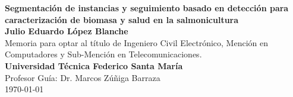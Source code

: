 \pagestyle{fancy}

\begin{center}
    {\singlespacing\Large{\textbf{Segmentación de instancias y seguimiento basado en detección para caracterización de biomasa y salud en la salmonicultura}}}\\

    \normalsize
    \textbf{Julio Eduardo López Blanche}\\

    Memoria para optar al título de Ingeniero Civil Electrónico, Mención en Computadores y Sub-Mención en Telecomunicaciones.\\

    \textbf{Universidad Técnica Federico Santa María}\\

    Profesor Guía: Dr. Marcos Zúñiga Barraza\\

    \monthyeardate\today
\end{center}

